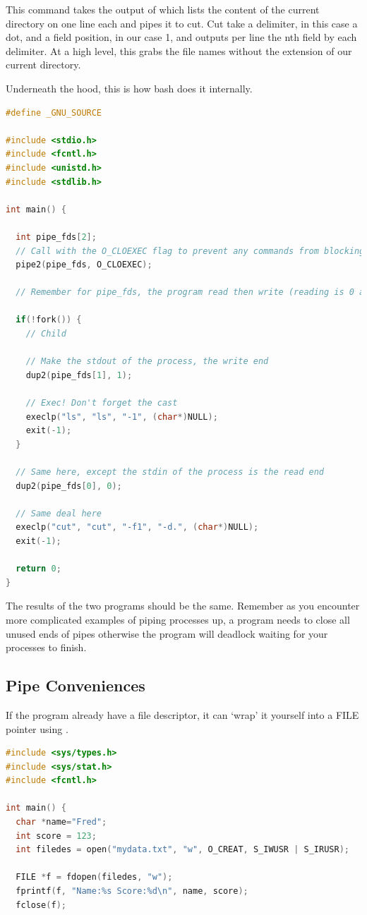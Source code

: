 This command takes the output of  which lists the content of the current directory on one line each and pipes it to cut.
Cut take a delimiter, in this case a dot, and a field position, in our case 1, and outputs per line the nth field by each delimiter.
At a high level, this grabs the file names without the extension of our current directory.

Underneath the hood, this is how bash does it internally.

\begin{lstlisting}[language=C]
#define _GNU_SOURCE

#include <stdio.h>
#include <fcntl.h>
#include <unistd.h>
#include <stdlib.h>

int main() {

  int pipe_fds[2];
  // Call with the O_CLOEXEC flag to prevent any commands from blocking
  pipe2(pipe_fds, O_CLOEXEC);

  // Remember for pipe_fds, the program read then write (reading is 0 and writing is 1)

  if(!fork()) {
    // Child

    // Make the stdout of the process, the write end
    dup2(pipe_fds[1], 1);

    // Exec! Don't forget the cast
    execlp("ls", "ls", "-1", (char*)NULL);
    exit(-1);
  }

  // Same here, except the stdin of the process is the read end
  dup2(pipe_fds[0], 0);

  // Same deal here
  execlp("cut", "cut", "-f1", "-d.", (char*)NULL);
  exit(-1);

  return 0;
}
\end{lstlisting}

The results of the two programs should be the same.
Remember as you encounter more complicated examples of piping processes up, a program needs to close all unused ends of pipes otherwise the program will deadlock waiting for your processes to finish.

\subsection{Pipe Conveniences}

If the program already have a file descriptor, it can `wrap' it yourself into a FILE pointer using .

\begin{lstlisting}[language=C]
#include <sys/types.h>
#include <sys/stat.h>
#include <fcntl.h>

int main() {
  char *name="Fred";
  int score = 123;
  int filedes = open("mydata.txt", "w", O_CREAT, S_IWUSR | S_IRUSR);

  FILE *f = fdopen(filedes, "w");
  fprintf(f, "Name:%s Score:%d\n", name, score);
  fclose(f);
\end{lstlisting}


